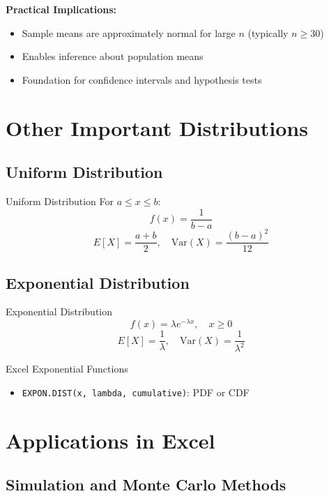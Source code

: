 \documentclass[12pt,a4paper]{book}
\begin{document}
\textbf{Practical Implications:}
\begin{itemize}
    \item Sample means are approximately normal for large $n$ (typically $n \geq 30$)
    \item Enables inference about population means
    \item Foundation for confidence intervals and hypothesis tests
\end{itemize}

\section{Other Important Distributions}

\subsection{Uniform Distribution}

\begin{definition}{Uniform Distribution}
For $a \leq x \leq b$:
\[
f(x) = \frac{1}{b-a}
\]
\[
E[X] = \frac{a+b}{2}, \quad \text{Var}(X) = \frac{(b-a)^2}{12}
\]
\end{definition}

\subsection{Exponential Distribution}

\begin{definition}{Exponential Distribution}
\[
f(x) = \lambda e^{-\lambda x}, \quad x \geq 0
\]
\[
E[X] = \frac{1}{\lambda}, \quad \text{Var}(X) = \frac{1}{\lambda^2}
\]
\end{definition}

\begin{example}{Excel Exponential Functions}
\begin{itemize}
    \item \texttt{EXPON.DIST(x, lambda, cumulative)}: PDF or CDF
\end{itemize}
\end{example}

\section{Applications in Excel}

\subsection{Simulation and Monte Carlo Methods}
\end{document}
